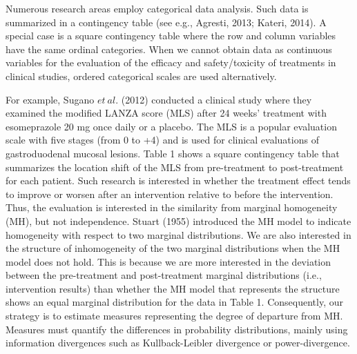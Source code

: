 \documentclass[a4j,12pt]{article}
\begin{document}
Numerous research areas employ categorical data analysis. 
Such data is summarized in a contingency table (see e.g., Agresti, 2013; Kateri, 2014).
A special case is a square contingency table where the row and column variables have the same ordinal categories. 
When we cannot obtain data as continuous variables for the evaluation of the efficacy and safety/toxicity of treatments in clinical studies, ordered categorical scales are used alternatively.

For example, Sugano $et~al.$ (2012) conducted a clinical study where they examined the modified LANZA score (MLS) after 24 weeks’ treatment with esomeprazole 20 mg once daily or a placebo.
The MLS is a popular evaluation scale with five stages (from 0 to +4) and is used for clinical evaluations of gastroduodenal mucosal lesions.
Table 1 shows a square contingency table that summarizes the location shift of the MLS from pre-treatment to post-treatment for each patient.
Such research is interested in whether the treatment effect tends to improve or worsen after an intervention relative to before the intervention.
Thus, the evaluation is interested in the similarity from marginal homogeneity (MH), but not independence.
Stuart (1955) introduced the MH model to indicate homogeneity with respect to two marginal distributions.
We are also interested in the structure of inhomogeneity of the two marginal distributions when the MH model does not hold.
This is because we are more interested in the deviation between the pre-treatment and post-treatment marginal distributions (i.e., intervention results) than whether the MH model that represents the structure shows an equal marginal distribution for the data in Table 1.
Consequently, our strategy is to estimate measures representing the degree of departure from MH.
Measures must quantify the differences in probability distributions, mainly using information divergences such as Kullback-Leibler divergence or power-divergence.
\end{document}

